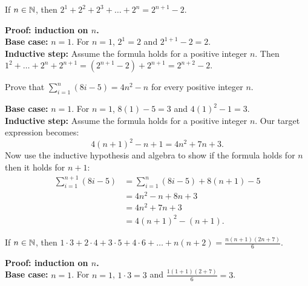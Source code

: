 \documentclass{article}
\begin{document}
\begin{problem}
If $n \in \mathbb{N}$, then $2^1 + 2^2 + 2^3 + \ldots + 2^n = 2^{n+1} - 2$.
\end{problem}

\textbf{Proof: induction on $n$.}
\\

\textbf{Base case:} $n = 1$. For $n = 1$, $2^1 = 2$ and $2^{1+1} - 2 = 2$.
\\

\textbf{Inductive step:} Assume the formula holds for a positive integer $n$. Then $1^2 + \ldots + 2^n + 2^{n+1} = (2^{n+1} - 2) + 2^{n+1} = 2^{n+2} - 2$.

\begin{problem}
Prove that $\sum\limits_{i=1}^n (8i - 5) = 4n^2 - n$ for every positive integer $n$.
\end{problem}

\textbf{Base case:} $n = 1$. For $n = 1$, $8(1) - 5 = 3$ and $4(1)^2 - 1 = 3$.
\\

\textbf{Inductive step:} Assume the formula holds for a positive integer $n$. Our target expression becomes:
$$4(n+1)^2 - n+1 = 4n^2 + 7n + 3.$$
Now use the inductive hypothesis and algebra to show if the formula holds for $n$ then it holds for $n+1$:
\begin{align*}
  \sum_{i=1}^{n+1} (8i - 5) & = \sum_{i=1}^{n} (8i - 5) + 8(n+1) - 5 \\
                            & = 4n^2 - n + 8n + 3                    \\
                            & = 4n^2 + 7n + 3                        \\
                            & = 4(n+1)^2 - (n+1).
\end{align*}

\begin{problem}
If $n \in \mathbb{N}$, then $1\cdot 3 + 2\cdot 4 + 3\cdot 5 + 4\cdot 6 + \ldots + n(n+2) = \frac{n(n+1)(2n+7)}{6}$.
\end{problem}
\textbf{Proof: induction on $n$.}
\\

\textbf{Base case:} $n = 1$. For $n = 1$, $1\cdot 3 = 3$ and $\frac{1(1+1)(2+7)}{6} = 3$.
\\
\end{document}

